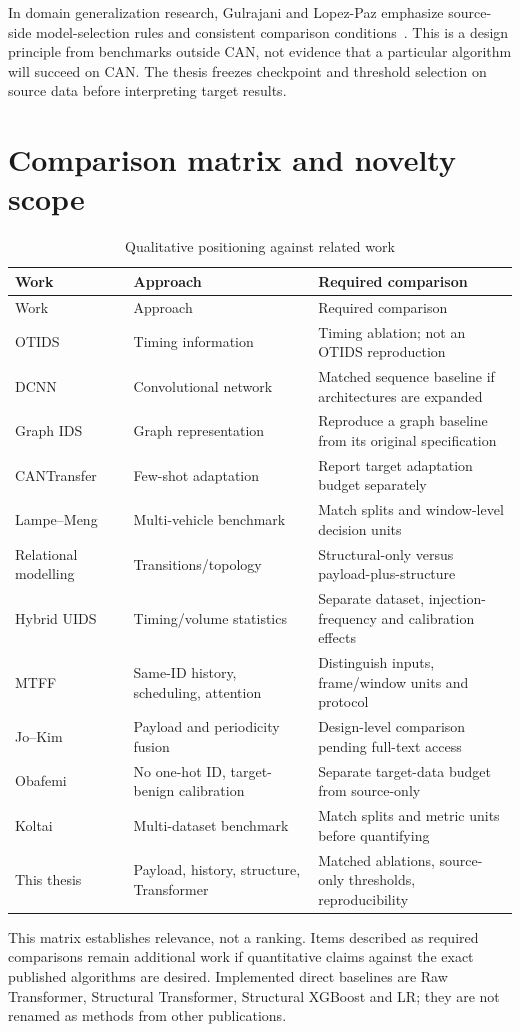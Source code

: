 \documentclass[12pt,a4paper,oneside,openany]{extbook}
\begin{document}
In domain generalization research, Gulrajani and Lopez-Paz emphasize source-side model-selection rules and consistent comparison conditions~\cite{gulrajani2021domainbed}. This is a design principle from benchmarks outside CAN, not evidence that a particular algorithm will succeed on CAN. The thesis freezes checkpoint and threshold selection on source data before interpreting target results.

\section{Comparison matrix and novelty scope}
\begin{longtable}{P{3.4cm}P{4.3cm}P{5.2cm}}
\caption{Qualitative positioning against related work}\label{tab:related}\\\toprule
Work & Approach & Required comparison\\\midrule\endfirsthead
\toprule Work & Approach & Required comparison\\\midrule\endhead
OTIDS~\cite{lee2017otids} & Timing information & Timing ablation; not an OTIDS reproduction\\
DCNN~\cite{song2020dcnn} & Convolutional network & Matched sequence baseline if architectures are expanded\\
Graph IDS~\cite{islam2020graph} & Graph representation & Reproduce a graph baseline from its original specification\\
CANTransfer~\cite{tariq2020cantransfer} & Few-shot adaptation & Report target adaptation budget separately\\
Lampe--Meng~\cite{lampe2024curated} & Multi-vehicle benchmark & Match splits and window-level decision units\\
Relational modelling~\cite{khreasat2026relational} & Transitions/topology & Structural-only versus payload-plus-structure\\
Hybrid UIDS~\cite{s26051489} & Timing/volume statistics & Separate dataset, injection-frequency and calibration effects\\
MTFF~\cite{dong2026mtff} & Same-ID history, scheduling, attention & Distinguish inputs, frame/window units and protocol\\
Jo--Kim~\cite{jo2026fusion} & Payload and periodicity fusion & Design-level comparison pending full-text access\\
Obafemi~\cite{obafemi2026travel} & No one-hot ID, target-benign calibration & Separate target-data budget from source-only\\
Koltai~\cite{koltai2026trust} & Multi-dataset benchmark & Match splits and metric units before quantifying\\
This thesis & Payload, history, structure, Transformer & Matched ablations, source-only thresholds, reproducibility\\\bottomrule
\end{longtable}
This matrix establishes relevance, not a ranking. Items described as required comparisons remain additional work if quantitative claims against the exact published algorithms are desired. Implemented direct baselines are Raw Transformer, Structural Transformer, Structural XGBoost and LR; they are not renamed as methods from other publications.
\end{document}
